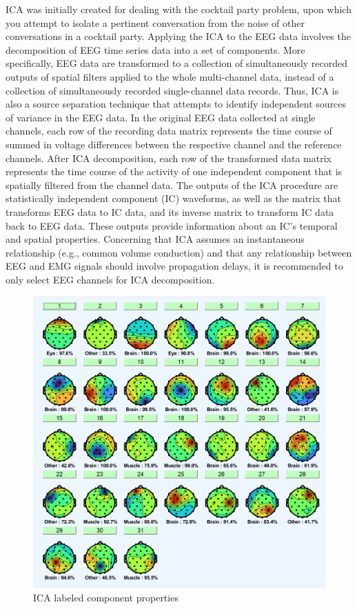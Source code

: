 \documentclass[12pt,a4paper,titlepage,openany]{report}
\begin{document}
ICA was initially created for dealing with the cocktail party problem, upon which you attempt to isolate a pertinent conversation from the noise of other conversations in a cocktail party. Applying the ICA to the EEG data involves the decomposition of EEG time series data into a set of components. More speciﬁcally, EEG data are transformed to a collection of simultaneously recorded outputs of spatial ﬁlters applied to the whole multi-channel data, instead of a collection of simultaneously recorded single-channel data records. Thus, ICA is also a source separation technique that attempts to identify independent sources of variance in the EEG data. 
In the original EEG data collected at single channels, each row of the recording data matrix represents the time course of summed in voltage differences between the respective channel and the reference channels. 
After ICA decomposition, each row of the transformed data matrix represents the time course of the activity of one independent component that is spatially ﬁltered from the channel data. 
The outputs of the ICA procedure are statistically independent component (IC) waveforms, as well as the matrix that transforms EEG data to IC data, and its inverse matrix to transform IC data back to EEG data. 
These outputs provide information about an IC’s temporal and spatial properties. Concerning that ICA assumes an instantaneous relationship (e.g., common volume conduction) and that any relationship between EEG and EMG signals should involve propagation delays, it is recommended to only select EEG channels for ICA decomposition\cite{makkar2023}.

\begin{figure}[H]
     \centering
     \includegraphics[width=0.8\linewidth]{./misc/Component Properties.png}
     \caption{ICA labeled component properties}
     \label{fig:component-properties-ICA}
\end{figure}
\end{document}
